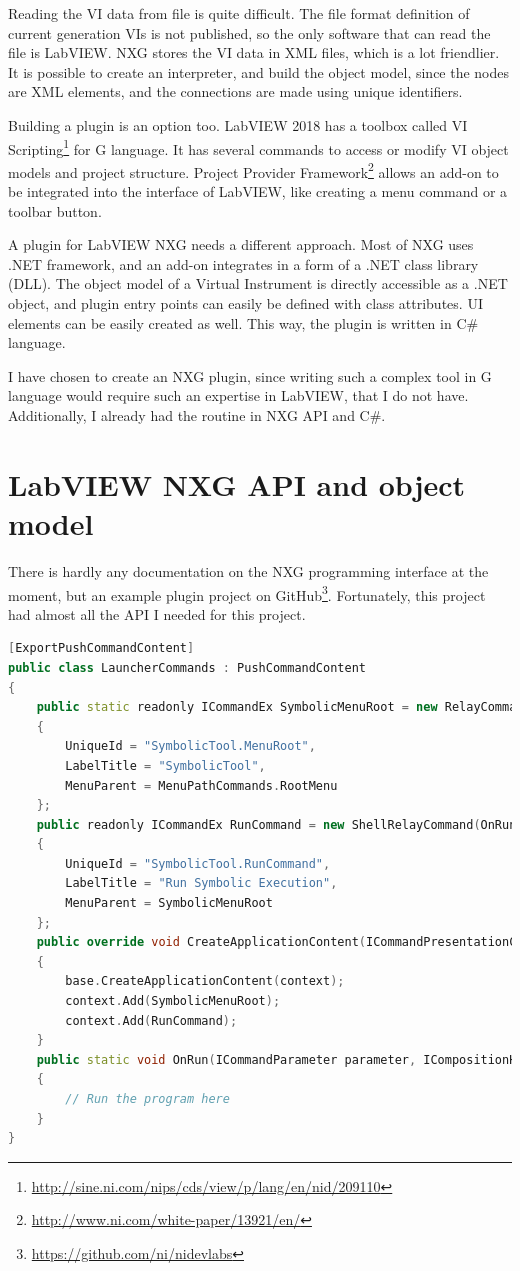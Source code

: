 Reading the VI data from file is quite difficult. The file format definition of current generation VIs is not published, so the only software that can read the file is LabVIEW. NXG stores the VI data in XML files, which is a lot friendlier. It is possible to create an interpreter, and build the object model, since the nodes are XML elements, and the connections are made using unique identifiers.

Building a plugin is an option too. LabVIEW 2018 has a toolbox called VI Scripting\footnote{\url{http://sine.ni.com/nips/cds/view/p/lang/en/nid/209110}} for G language. It has several commands to access or modify VI object models and project structure. Project Provider Framework\footnote{\url{http://www.ni.com/white-paper/13921/en/}} allows an add-on to be integrated into the interface of LabVIEW, like creating a menu command or a toolbar button.

A plugin for LabVIEW NXG needs a different approach. Most of NXG uses .NET framework, and an add-on integrates in a form of a .NET class library (DLL). The object model of a Virtual Instrument is directly accessible as a .NET object, and plugin entry points can easily be defined with class attributes. UI elements can be easily created as well. This way, the plugin is written in C\# language.

I have chosen to create an NXG plugin, since writing such a complex tool in G language would require such an expertise in LabVIEW, that I do not have. Additionally, I already had the routine in NXG API and C\#.
\section{LabVIEW NXG API and object model}
There is hardly any documentation on the NXG programming interface at the moment, but an example plugin project on GitHub\footnote{\url{https://github.com/ni/nidevlabs}}. Fortunately, this project had almost all the API I needed for this project.
\lstset{escapechar=@}
\begin{lstlisting}[frame=single,escapechar=@,float=!ht,caption={NXG plugin entry point},captionpos=b,label={lst:menuapi},language=C++]
[ExportPushCommandContent]
public class LauncherCommands : PushCommandContent
{
    public static readonly ICommandEx SymbolicMenuRoot = new RelayCommandEx(RelayCommandEx.HandleNoOp)
    {
        UniqueId = "SymbolicTool.MenuRoot",
        LabelTitle = "SymbolicTool",
        MenuParent = MenuPathCommands.RootMenu
    };
    public readonly ICommandEx RunCommand = new ShellRelayCommand(OnRun)
    {
        UniqueId = "SymbolicTool.RunCommand",
        LabelTitle = "Run Symbolic Execution",
        MenuParent = SymbolicMenuRoot
    };
    public override void CreateApplicationContent(ICommandPresentationContext context)
    {
        base.CreateApplicationContent(context);
        context.Add(SymbolicMenuRoot);
        context.Add(RunCommand);
    }
    public static void OnRun(ICommandParameter parameter, ICompositionHost host, DocumentEditSite site)
    {
        // Run the program here
    }
}
\end{lstlisting}

